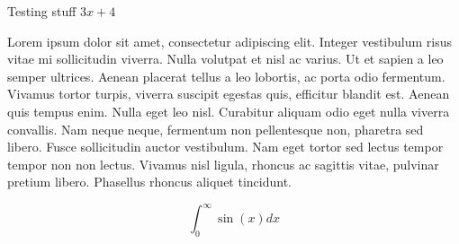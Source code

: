 \documentclass[preview]{standalone}
\begin{document}
\begin{varwidth}{300pt}
Testing stuff $3x+4$

Lorem ipsum dolor sit amet, consectetur adipiscing elit. Integer vestibulum risus vitae mi sollicitudin viverra. Nulla volutpat et nisl ac varius. Ut et sapien a leo semper ultrices. Aenean placerat tellus a leo lobortis, ac porta odio fermentum. Vivamus tortor turpis, viverra suscipit egestas quis, efficitur blandit est. Aenean quis tempus enim. Nulla eget leo nisl. Curabitur aliquam odio eget nulla viverra convallis. Nam neque neque, fermentum non pellentesque non, pharetra sed libero. Fusce sollicitudin auctor vestibulum. Nam eget tortor sed lectus tempor tempor non non lectus. Vivamus nisl ligula, rhoncus ac sagittis vitae, pulvinar pretium libero. Phasellus rhoncus aliquet tincidunt.

\[
  \int_0^\infty \sin\left(x\right) dx
\]
\end{varwidth}
\end{document}
